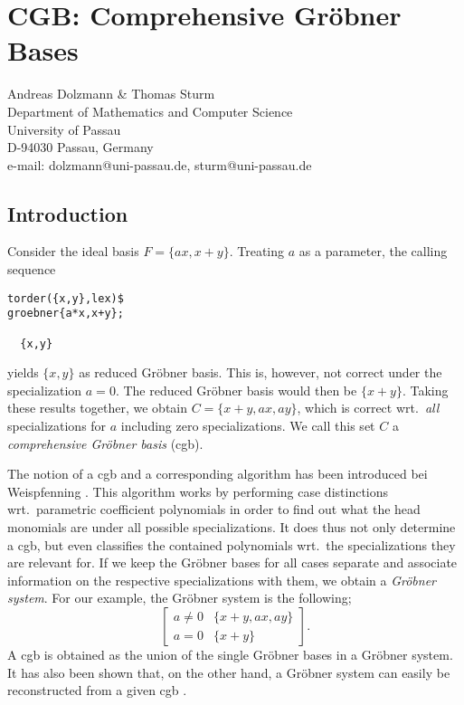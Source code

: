 \documentclass[11pt,letterpaper]{book}
\makeatletter
\newcommand{\underscore}{\_}
\newcommand{\ttindex}[1]{{\renewcommand{\_}{\protect\underscore}%
                          \index{#1@{\tt #1}}}}
\makeatother
\begin{document}
\chapter{CGB: Comprehensive Gr\"obner Bases}
\label{CGB}


{\footnotesize
\begin{center}
Andreas Dolzmann \& Thomas Sturm\\
Department of Mathematics and Computer Science\\ University of Passau\\
D-94030 Passau, Germany\\[1ex]
e-mail: dolzmann@uni-passau.de, sturm@uni-passau.de
\end{center}
}
\ttindex{REDLOG}


\section{Introduction}
Consider the ideal basis $F=\{ax,x+y\}$. Treating $a$ as a parameter,
the calling sequence
{\small\begin{verbatim}
torder({x,y},lex)$
groebner{a*x,x+y};

  {x,y}
\end{verbatim}}
yields $\{x,y\}$ as reduced Gr\"obner basis. This is, however, not
correct under the specialization $a=0$. The reduced Gr\"obner basis
would then be $\{x+y\}$. Taking these results together, we obtain
$C=\{x+y,ax,ay\}$, which is correct wrt.~{\em all} specializations for
$a$ including zero specializations. We call this set $C$ a {\em
comprehensive Gr\"obner basis} ({\sc cgb}).

The notion of a {\sc cgb} and a corresponding algorithm has been
introduced bei Weispfenning \cite{Weispfenning:92}. This algorithm
works by performing case distinctions wrt.~parametric coefficient
polynomials in order to find out what the head monomials are under all
possible specializations. It does thus not only determine a {\sc cgb},
but even classifies the contained polynomials wrt.~the specializations
they are relevant for. If we keep the Gr\"obner bases for all cases
separate and associate information on the respective specializations
with them, we obtain a {\em Gr\"obner system}. For our example, the
Gr\"obner system is the following;
$$
\left[
\begin{array}{c|c}
a\neq0 & \{x+y,ax,ay\}\\
a=0 & \{x+y\}
\end{array}
\right].
$$
A {\sc cgb} is obtained as the union of the single Gr\"obner bases in
a Gr\"obner system. It has also been shown that, on the other hand, a
Gr\"obner system can easily be reconstructed from a given {\sc cgb}
\cite{Weispfenning:92}.
\end{document}
